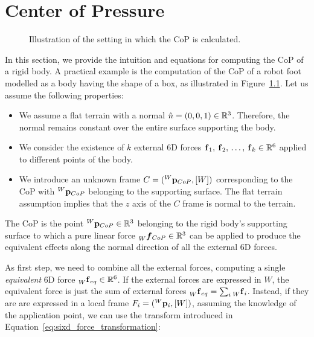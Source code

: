 \chapter{Center of Pressure}
\label{appendix:center_of_pressure}

\begin{figure}
    \centering
    \caption{Illustration of the setting in which the \ac{CoP} is calculated.}
    \label{fig:center_of_pressure}
\end{figure}

In this section, we provide the intuition and equations for computing the \ac{CoP} of a rigid body.
A practical example is the computation of the \ac{CoP} of a robot foot modelled as a body having the shape of a box, as illustrated in Figure~\ref{fig:center_of_pressure}.
Let us assume the following properties:
%
\begin{itemize}
    \item We assume a flat terrain with a normal $\hat{n} = (0, 0, 1) \in \realn^3$. Therefore, the normal remains constant over the entire surface supporting the body.
    \item We consider the existence of $k$ external 6D forces $\forcesix_1,\, \forcesix_2,\, \dots, \, \forcesix_k \in \realn^6$ applied to different points of the body.
    \item We introduce an unknown frame $C = (\pos[W]_{CoP}, [W])$ corresponding to the \ac{CoP} with $\pos[W]_{CoP}$ belonging to the supporting surface. The flat terrain assumption implies that the $z$ axis of the $C$ frame is normal to the terrain.
\end{itemize}
%
\begin{definition*}
    The \ac{CoP} is the point $\pos[W]_{CoP} \in \realn^3$ belonging to the rigid body's supporting surface to which a pure linear force $\forcelin[W]_{CoP} \in \realn^3$ can be applied to produce the equivalent effects along the normal direction of all the external 6D forces.
\end{definition*}
%
As first step, we need to combine all the external forces, computing a single \emph{equivalent} 6D force $\forcesix[W]_{eq} \in \realn^6$.
If the external forces are expressed in $W$, the equivalent force is just the sum of external forces $\forcesix[W]_{eq} = \sum_{i} \forcesix[W]_i$.
Instead, if they are are expressed in a local frame $F_i = (\pos[W]_i, [W])$, assuming the knowledge of the application point, we can use the transform introduced in Equation~\eqref{eq:sixd_force_transformation}:
